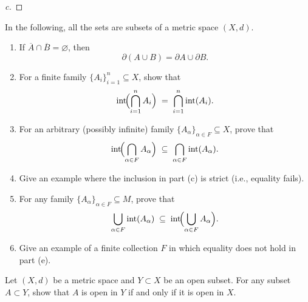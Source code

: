 \begin{proof}[c]
  
\end{proof}

\begin{problem}
    In the following, all the sets are subsets of a metric space $(X,d)$.

 \begin{enumerate}
  \item[(a)] If $\overline{A}\cap\overline{B}=\varnothing$, then 
  \[
  \partial(A\cup B) = \partial A \cup \partial B.
  \]

  \item[(b)] For a finite family $\{A_i\}_{i=1}^n\subseteq X$, show that
  \[
  \operatorname{int}\!\Bigl(\bigcap_{i=1}^n A_i\Bigr)
  \;=\;
  \bigcap_{i=1}^n \operatorname{int}(A_i).
  \]

  \item[(c)] For an arbitrary (possibly infinite) family $\{A_\alpha\}_{\alpha\in F}\subseteq X$, prove that
  \[
  \operatorname{int}\!\Bigl(\bigcap_{\alpha\in F} A_\alpha\Bigr)
  \;\subseteq\;
  \bigcap_{\alpha\in F}\operatorname{int}(A_\alpha).
  \]

  \item[(d)] Give an example where the inclusion in part \textup{(c)} is strict (i.e., equality fails).

  \item[(e)] For any family $\{A_\alpha\}_{\alpha\in F}\subseteq M$, prove that
  \[
  \bigcup_{\alpha\in F}\operatorname{int}(A_\alpha)
  \;\subseteq\;
  \operatorname{int}\!\Bigl(\bigcup_{\alpha\in F} A_\alpha\Bigr).
  \]

  \item[(f)] Give an example of a finite collection $F$ in which equality does not hold in part \textup{(e)}.
\end{enumerate}

\end{problem}

\begin{problem}
    Let $(X, d)$ be a metric space and $Y \subset X$ be an open subset. For any subset $A \subset Y$, show
that $A$ is open in $Y$ if and only if it is open in $X$.
\end{problem}

